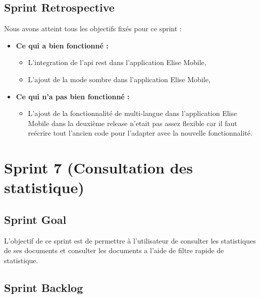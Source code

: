 \subsection{Sprint Retrospective}
Nous avons atteint tous les objectifs fixés pour ce sprint :
\begin{itemize}
  \item \textbf{Ce qui a bien fonctionné :}
  \begin{itemize}
    \item L'integration de l'api rest dans l'application Elise Mobile,
    \item L'ajout de la mode sombre dans l'application Elise Mobile,
  \end{itemize}

    \item \textbf{Ce qui n'a pas bien fonctionné :}
    \begin{itemize}
      \item L'ajout de la fonctionnalité de multi-langue dans l'application Elise Mobile dans la deuxième release n'etait pas assez flexible car il faut reécrire tout l'ancien code pour l'adapter avec la nouvelle fonctionnalité.
    \end{itemize}
      
\end{itemize}
\section{Sprint 7 (Consultation des statistique)}

\subsection{Sprint Goal}
L'objectif de ce sprint est de permettre à l'utilisateur de consulter les statistiques de ses documents et consulter les documents a l'aide de filtre rapide de statistique.

\subsection{Sprint Backlog}


